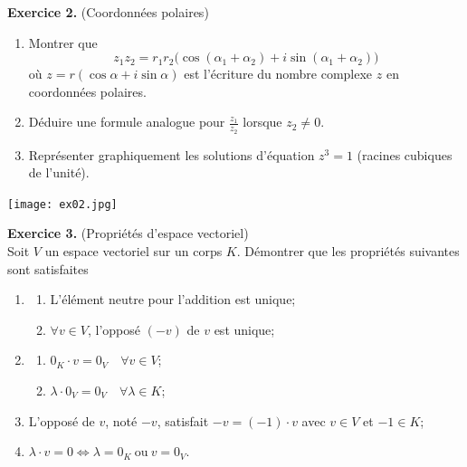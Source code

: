 \documentclass[a4paper, 10pt]{report}
\begin{document}
	\fancyhf{}
	\renewcommand{\headrule}
	{\rule{\textwidth}{0pt}}
	
	\newpage
	
	\noindent
	\textbf{Exercice 2.} (Coordonnées polaires)
	
	\begin{enumerate}[label=(\alph*)]
		\item Montrer que
		\[
			z_1z_2 = r_1r_2\big(\cos(\alpha_1 + \alpha_2)
				+ i\sin(\alpha_1 + \alpha_2)\big)
		\]
		où $z = r(\cos\alpha + i \sin\alpha)$ est l'écriture du
		nombre complexe $z$ en coordonnées polaires.
		\item Déduire une formule analogue pour $\frac{z_1}{z_2}$
		lorsque $z_2 \neq 0$.
		\item Représenter graphiquement les solutions d'équation
		$z^3 = 1$ (racines cubiques de l'unité).
	\end{enumerate}
	\texttt{[image: ex02.jpg]}
	
	\newpage
	
	\noindent
	\textbf{Exercice 3.} (Propriétés d'espace vectoriel)\\
	Soit $V$ un espace vectoriel sur un corps $K$. Démontrer que les
	propriétés suivantes sont satisfaites
	
	\begin{enumerate}[label=\arabic*.]
		\item \begin{enumerate}[label=(\alph*)]
			\item L'élément neutre pour l'addition est unique;
			\item $\forall v \in V$, l'opposé $(-v)$ de $v$ est unique;
		\end{enumerate}
		\item \begin{enumerate}[label=(\alph*)]
			\item $0_K \cdot v = 0_V \quad \forall v \in V$;
			\item $\lambda \cdot 0_V = 0_V \quad \forall \lambda \in K$;
		\end{enumerate}
		\item L'opposé de $v$, noté $-v$, satisfait $-v = (-1) \cdot v$
		avec $v \in V$ et $-1 \in K$;
		\item $\lambda \cdot v = 0 \iff
			\lambda = 0_K \ \text{ou}\ v = 0_V$.
	\end{enumerate}
	
\end{document}

